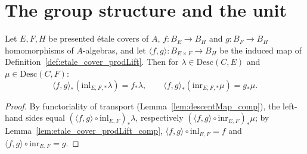 \section{The group structure and the unit}

\begin{lemma}
  \label{lem:PicEtAff_descentMap_prodLift}
  \leanok
  Let \(E, F, H\) be presented \'etale covers of \(A\), \(f \colon B_E \to B_H\) and
  \(g \colon B_F \to B_H\) homomorphisms of \(A\)-algebras, and let
  \(\langle f,g\rangle \colon B_{E \times F} \to B_H\) be the induced map of
  Definition~\ref{def:etale_cover_prodLift}. Then for \(\lambda \in \mathrm{Desc}(C,E)\) and
  \(\mu \in \mathrm{Desc}(C,F)\):
  \[
    \langle f,g\rangle_{*}(\mathrm{inl}_{E,F,*}\lambda) = f_{*}\lambda, \qquad
    \langle f,g\rangle_{*}(\mathrm{inr}_{E,F,*}\mu) = g_{*}\mu.
  \]
\end{lemma}
\begin{proof}
  \leanok
  By functoriality of transport (Lemma~\ref{lem:descentMap_comp}), the left-hand sides equal
  \((\langle f,g\rangle \circ \mathrm{inl}_{E,F})_{*}\lambda\), respectively
  \((\langle f,g\rangle \circ \mathrm{inr}_{E,F})_{*}\mu\); by
  Lemma~\ref{lem:etale_cover_prodLift_comp}, \(\langle f,g\rangle \circ \mathrm{inl}_{E,F} = f\)
  and \(\langle f,g\rangle \circ \mathrm{inr}_{E,F} = g\).
\end{proof}

